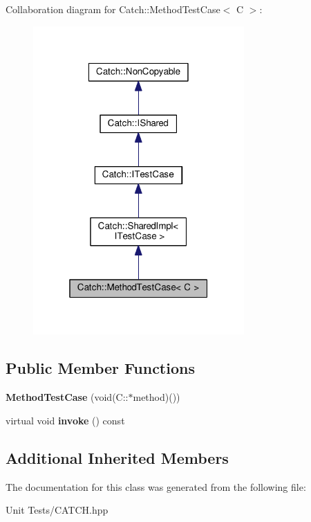 Collaboration diagram for Catch\+:\+:Method\+Test\+Case$<$ C $>$\+:
\nopagebreak
\begin{figure}[H]
\begin{center}
\leavevmode
\includegraphics[width=229pt]{classCatch_1_1MethodTestCase__coll__graph}
\end{center}
\end{figure}
\subsection*{Public Member Functions}
\begin{DoxyCompactItemize}
\item 
{\bfseries Method\+Test\+Case} (void(C\+::$\ast$method)())\hypertarget{classCatch_1_1MethodTestCase_a7b043b85dae371358255dd9dc6582e7b}{}\label{classCatch_1_1MethodTestCase_a7b043b85dae371358255dd9dc6582e7b}

\item 
virtual void {\bfseries invoke} () const \hypertarget{classCatch_1_1MethodTestCase_a39cc4b760dd71adc3f7550bc1e7eb697}{}\label{classCatch_1_1MethodTestCase_a39cc4b760dd71adc3f7550bc1e7eb697}

\end{DoxyCompactItemize}
\subsection*{Additional Inherited Members}


The documentation for this class was generated from the following file\+:\begin{DoxyCompactItemize}
\item 
Unit Tests/C\+A\+T\+C\+H.\+hpp\end{DoxyCompactItemize}
